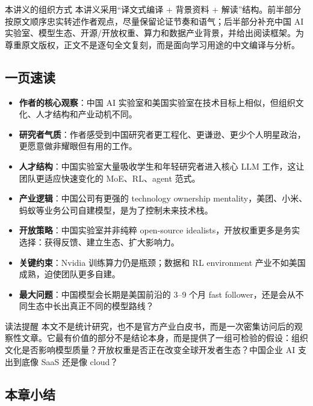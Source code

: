 \documentclass[a4paper]{article}
\begin{document}
\begin{importantbox}{本讲义的组织方式}
本讲义采用``译文式编译 + 背景资料 + 解读''结构。前半部分按原文顺序忠实转述作者观点，尽量保留论证节奏和语气；后半部分补充中国 AI 实验室、模型生态、开源/开放权重、算力和数据产业背景，并给出阅读框架。为尊重原文版权，正文不是逐句全文复刻，而是面向学习用途的中文编译与分析。
\end{importantbox}

\subsection{一页速读}

\begin{itemize}[leftmargin=1.5em]
    \item \textbf{作者的核心观察}：中国 AI 实验室和美国实验室在技术目标上相似，但组织文化、人才结构和产业动机不同。
    \item \textbf{研究者气质}：作者感受到中国研究者更工程化、更谦逊、更少个人明星政治，更愿意做非耀眼但有用的工作。
    \item \textbf{人才结构}：中国实验室大量吸收学生和年轻研究者进入核心 LLM 工作，这让团队更适应快速变化的 MoE、RL、agent 范式。
    \item \textbf{产业逻辑}：中国公司有更强的 technology ownership mentality，美团、小米、蚂蚁等业务公司自建模型，是为了控制未来技术栈。
    \item \textbf{开放策略}：中国实验室并非纯粹 open-source idealists，开放权重更多是务实选择：获得反馈、建立生态、扩大影响力。
    \item \textbf{关键约束}：Nvidia 训练算力仍是瓶颈；数据和 RL environment 产业不如美国成熟，迫使团队更多自建。
    \item \textbf{最大问题}：中国模型会长期是美国前沿的 3--9 个月 fast follower，还是会从不同生态中长出真正不同的模型路线？
\end{itemize}

\begin{warningbox}{读法提醒}
本文不是统计研究，也不是官方产业白皮书，而是一次密集访问后的观察性文章。它最有价值的部分不是结论本身，而是提供了一组可检验的假设：组织文化是否影响模型质量？开放权重是否正在改变全球开发者生态？中国企业 AI 支出到底像 SaaS 还是像 cloud？
\end{warningbox}

\subsection{本章小结}
\end{document}
